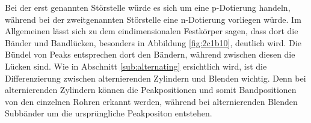 Bei der erst genannten Störstelle würde es sich um eine p-Dotierung handeln, während bei der zweitgenannten Störstelle eine n-Dotierung vorliegen würde.
Im Allgemeinen lässt sich zu dem eindimensionalen Festkörper sagen, dass dort die Bänder und Bandlücken, besonders in Abbildung \ref{fig:2c1b10},
deutlich wird. Die Bündel von Peaks entsprechen dort den Bändern, während zwischen diesen die Lücken sind.
Wie in Abschnitt \ref{sub:alternating} ersichtlich wird, ist die Differenzierung zwischen alternierenden Zylindern und Blenden wichtig.
Denn bei alternierenden Zylindern können die Peakpositionen und somit Bandpositionen von den einzelnen Rohren erkannt werden, während 
bei alternierenden Blenden Subbänder um die ursprüngliche Peakpositon entstehen.